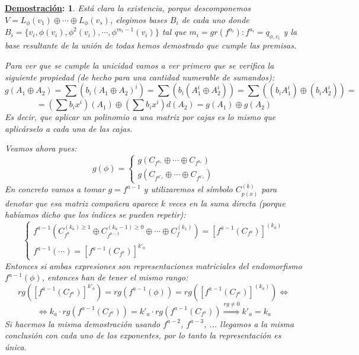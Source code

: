 \documentclass[10pt,a4paper,openright]{book}
\theoremstyle{break}
\newtheorem*{demo}{\underline{Demostración}:}
\begin{document}
\begin{demo}
Está clara la existencia, porque descomponemos $V=L_\phi(v_1)\oplus \cdots \oplus L_\phi(v_s)$, elegimos bases $B_i$ de cada uno donde $B_i=\{v_i, \phi(v_i), \phi^2(v_i), \cdots, \phi^{m_i-1}(v_i)\}$ tal que $m_i=gr(f^{a_i}): f^{a_i}=q_{\phi, v_i}$ y la base resultante de la unión de todas hemos demostrado que cumple las premisas.

Para ver que se cumple la unicidad vamos a ver primero que se verifica la siguiente propiedad (de hecho para una cantidad numerable de sumandos):
$$g(A_1\oplus A_2)=\sum \left(b_i (A_1\oplus A_2)^i\right)=\sum \left(b_i (A_1^i\oplus A_2^i)\right)=\sum \left((b_i A_1^i)\oplus (b_i A_2^i)\right)=$$
$$=\left(\sum b_i x^i\right)(A_1) \oplus \left(\sum b_i x^i\right)d (A_2)=g(A_1)\oplus g(A_2)$$
Es decir, que aplicar un polinomio a una matriz por cajas es lo mismo que aplicárselo a cada una de las cajas.

Veamos ahora pues:
$$g(\phi)=\begin{cases} g\left( C_{f^{a_1}} \oplus \cdots \oplus C_{f^{a_s}}\right) \\ g\left( C_{f^{a'_1}} \oplus \cdots \oplus C_{f^{a'_s}} \right)\end{cases}$$
En concreto vamos a tomar $g= f^{a-1}$ y utilizaremos el símbolo $C_{p(x)}^{(k)}$ para denotar que esa matriz compañera aparece $k$ veces en la suma directa (porque habíamos dicho que los índices se pueden repetir):
$$\begin{cases} f^{a-1}\left( C_{f^{a}}^{(k_a)\geq 1} \oplus C_{f^{a-1}}^{(k_a -1)\geq 0} \oplus \cdots \oplus C_{f}^{(k_1)}\right)= \left[f^{a-1}\left( C_{f^a} \right)\right]^{(k_a)} \\
f^{a-1}\left( \cdots \right) = \left[f^{a-1}\left( C_{f^a} \right)\right]^{k'_a}
\end{cases}$$
Entonces si ambas expresiones son representaciones matriciales del endomorfismo $f^{a-1}(\phi)$, entonces han de tener el mismo rango:
$$rg\left( \left[f^{a-1}\left( C_{f^a} \right)\right]^{k'_a} \right) = rg\left(f^{a-1}(\phi)\right) = rg\left( \left[f^{a-1}\left( C_{f^a} \right)\right]^{(k_a)}  \right)\Leftrightarrow $$
$$\Leftrightarrow k_a \cdot rg \left( f^{a-1}\left(C_{f^{a}}\right) \right) = k'_a \cdot rg \left( f^{a-1}\left(C_{f^{a}}\right) \right)\stackrel{rg \neq 0}{\Rightarrow} k'_a = k_a$$
Si hacemos la misma demostración usando $f^{a-2}$, $f^{a-3}$, ... llegamos a la misma conclusión con cada uno de los exponentes, por lo tanto la representación es única.
\end{demo}
\end{document}
